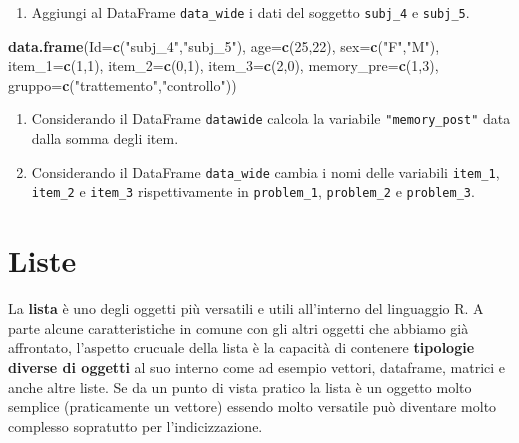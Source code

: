 \documentclass[
]{book}
\newenvironment{Shaded}{\begin{snugshade}}{\end{snugshade}}
\newcommand{\DataTypeTok}[1]{\textcolor[rgb]{0.13,0.29,0.53}{#1}}
\newcommand{\DecValTok}[1]{\textcolor[rgb]{0.00,0.00,0.81}{#1}}
\newcommand{\KeywordTok}[1]{\textcolor[rgb]{0.13,0.29,0.53}{\textbf{#1}}}
\newcommand{\NormalTok}[1]{#1}
\newcommand{\StringTok}[1]{\textcolor[rgb]{0.31,0.60,0.02}{#1}}
\providecommand{\tightlist}{%
  \setlength{\itemsep}{0pt}\setlength{\parskip}{0pt}}
\begin{document}
\begin{enumerate}
\def\labelenumi{\arabic{enumi}.}
\setcounter{enumi}{7}
\tightlist
\item
  Aggiungi al DataFrame \texttt{data\_wide} i dati del soggetto \texttt{subj\_4} e \texttt{subj\_5}.
\end{enumerate}

\begin{Shaded}
\begin{Highlighting}[]
\KeywordTok{data.frame}\NormalTok{(}\DataTypeTok{Id=}\KeywordTok{c}\NormalTok{(}\StringTok{"subj_4"}\NormalTok{,}\StringTok{"subj_5"}\NormalTok{),}
           \DataTypeTok{age=}\KeywordTok{c}\NormalTok{(}\DecValTok{25}\NormalTok{,}\DecValTok{22}\NormalTok{),}
           \DataTypeTok{sex=}\KeywordTok{c}\NormalTok{(}\StringTok{"F"}\NormalTok{,}\StringTok{"M"}\NormalTok{),}
           \DataTypeTok{item_1=}\KeywordTok{c}\NormalTok{(}\DecValTok{1}\NormalTok{,}\DecValTok{1}\NormalTok{),}
           \DataTypeTok{item_2=}\KeywordTok{c}\NormalTok{(}\DecValTok{0}\NormalTok{,}\DecValTok{1}\NormalTok{),}
           \DataTypeTok{item_3=}\KeywordTok{c}\NormalTok{(}\DecValTok{2}\NormalTok{,}\DecValTok{0}\NormalTok{),}
           \DataTypeTok{memory_pre=}\KeywordTok{c}\NormalTok{(}\DecValTok{1}\NormalTok{,}\DecValTok{3}\NormalTok{),}
           \DataTypeTok{gruppo=}\KeywordTok{c}\NormalTok{(}\StringTok{"trattemento"}\NormalTok{,}\StringTok{"controllo"}\NormalTok{))}
\end{Highlighting}
\end{Shaded}

\begin{enumerate}
\def\labelenumi{\arabic{enumi}.}
\setcounter{enumi}{8}
\tightlist
\item
  Considerando il DataFrame \texttt{datawide} calcola la variabile \texttt{"memory\_post"} data dalla somma degli item.
\item
  Considerando il DataFrame \texttt{data\_wide} cambia i nomi delle variabili \texttt{item\_1}, \texttt{item\_2} e \texttt{item\_3} rispettivamente in \texttt{problem\_1}, \texttt{problem\_2} e \texttt{problem\_3}.
\end{enumerate}

\hypertarget{list}{%
\chapter{Liste}\label{list}}

La \textbf{lista} è uno degli oggetti più versatili e utili all'interno del linguaggio R. A parte alcune caratteristiche in comune con gli altri oggetti che abbiamo già affrontato, l'aspetto crucuale della lista è la capacità di contenere \textbf{tipologie diverse di oggetti} al suo interno come ad esempio vettori, dataframe, matrici e anche altre liste. Se da un punto di vista pratico la lista è un oggetto molto semplice (praticamente un vettore) essendo molto versatile può diventare molto complesso sopratutto per l'indicizzazione.
\end{document}
